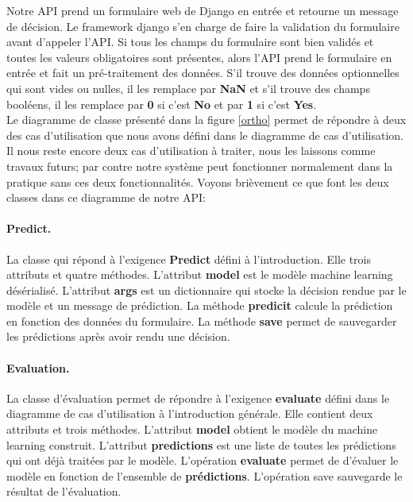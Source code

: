 \documentclass[12pt, french]{report}
\begin{document}

Notre API prend un formulaire web de Django en entrée et retourne un message de décision. Le framework django s'en charge de faire la validation du formulaire avant d'appeler l'API. Si tous les champs du formulaire sont bien validés et toutes les valeurs obligatoires sont présentes, alors l'API prend le formulaire en entrée et fait un pré-traitement des données. S'il trouve des données optionnelles qui sont vides ou nulles, il les remplace par \textbf{NaN} et s'il trouve des champs booléens, il les remplace par \textbf{0} si c'est \textbf{No} et par \textbf{1} si c'est \textbf{Yes}. \\

Le diagramme de classe présenté dans la figure \ref{ortho} permet de répondre à deux des cas d'utilisation que nous avons défini dans le diagramme de cas d'utilisation. Il nous reste encore deux cas d'utilisation à traiter, nous les laissons comme travaux futurs; par contre notre système peut fonctionner normalement dans la pratique sans ces deux fonctionnalités. Voyons brièvement ce que font les deux classes dans ce diagramme de notre API:

\paragraph{Predict. } La classe qui répond à l'exigence \textbf{Predict} défini à l'introduction. Elle trois attributs et quatre méthodes. L'attribut \textbf{model} est le modèle machine learning désérialisé. L'attribut \textbf{args} est un dictionnaire qui stocke la décision rendue par le modèle et un message de prédiction. La méthode \textbf{predicit} calcule la prédiction en fonction des données du formulaire. La méthode \textbf{save} permet de sauvegarder les prédictions après avoir rendu une décision. 
\paragraph{Evaluation. } La classe d'évaluation permet de répondre à l'exigence \textbf{evaluate} défini dans le diagramme de cas d'utilisation à l'introduction générale. Elle contient deux attributs et trois méthodes. L'attribut \textbf{model} obtient le modèle du machine learning construit. L'attribut \textbf{predictions} est une liste de toutes les prédictions qui ont déjà traitées par le modèle. L'opération \textbf{evaluate} permet de d'évaluer le modèle en fonction de l'ensemble de \textbf{prédictions}. L'opération save sauvegarde le résultat de l'évaluation. \\
\end{document}
